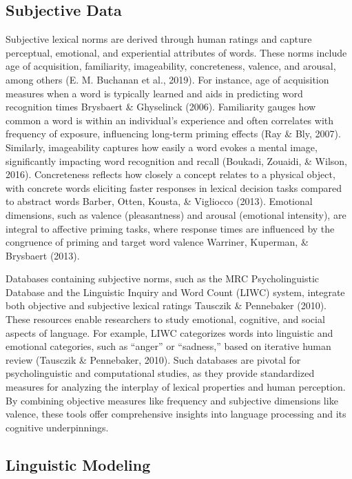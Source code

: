 \documentclass[
  english,
  man,floatsintext]{apa6}
\begin{document}
\subsection{Subjective Data}\label{subjective-data}

Subjective lexical norms are derived through human ratings and capture perceptual, emotional, and experiential attributes of words. These norms include age of acquisition, familiarity, imageability, concreteness, valence, and arousal, among others (E. M. Buchanan et al., 2019). For instance, age of acquisition measures when a word is typically learned and aids in predicting word recognition times Brysbaert \& Ghyselinck (2006). Familiarity gauges how common a word is within an individual's experience and often correlates with frequency of exposure, influencing long-term priming effects (Ray \& Bly, 2007). Similarly, imageability captures how easily a word evokes a mental image, significantly impacting word recognition and recall (Boukadi, Zouaidi, \& Wilson, 2016). Concreteness reflects how closely a concept relates to a physical object, with concrete words eliciting faster responses in lexical decision tasks compared to abstract words Barber, Otten, Kousta, \& Vigliocco (2013). Emotional dimensions, such as valence (pleasantness) and arousal (emotional intensity), are integral to affective priming tasks, where response times are influenced by the congruence of priming and target word valence Warriner, Kuperman, \& Brysbaert (2013).

Databases containing subjective norms, such as the MRC Psycholinguistic Database and the Linguistic Inquiry and Word Count (LIWC) system, integrate both objective and subjective lexical ratings Tausczik \& Pennebaker (2010). These resources enable researchers to study emotional, cognitive, and social aspects of language. For example, LIWC categorizes words into linguistic and emotional categories, such as ``anger'' or ``sadness,'' based on iterative human review (Tausczik \& Pennebaker, 2010). Such databases are pivotal for psycholinguistic and computational studies, as they provide standardized measures for analyzing the interplay of lexical properties and human perception. By combining objective measures like frequency and subjective dimensions like valence, these tools offer comprehensive insights into language processing and its cognitive underpinnings.

\subsection{Linguistic Modeling}\label{linguistic-modeling}
\end{document}

